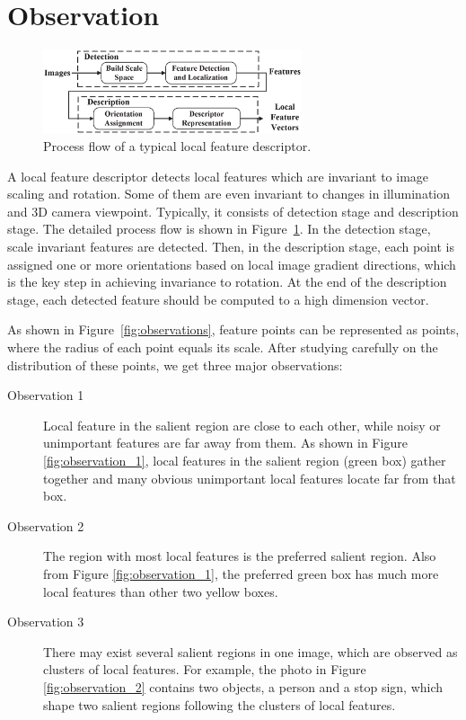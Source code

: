 \section{Observation}
\label{sec:observation}

\begin{figure}
	\centering
	\includegraphics[width=3.0in]{images/fig-workflow.eps}
	\caption{Process flow of a typical local feature descriptor.}
	\label{fig:workflow}
\end{figure}

A local feature descriptor detects local features which are invariant to image scaling and rotation. Some of them are even invariant to changes in illumination and 3D camera viewpoint. Typically, it consists of detection stage and description stage. The detailed process flow is shown in Figure~\ref{fig:workflow}. In the detection stage, scale invariant features are detected. Then, in the description stage, each point is assigned one or more orientations based on local image gradient directions, which is the key step in achieving invariance to rotation. At the end of the description stage, each detected feature should be computed to a high dimension vector. 

As shown in Figure~\ref{fig:observations}, feature points can be represented as points, where the radius of each point equals its scale. After studying carefully on the distribution of these points, we get three major observations:

\begin{description}
	
	\item[Observation 1]  Local feature in the salient region are close to each other, while noisy or unimportant features are far away from them. As shown in Figure \ref{fig:observation_1}, local features in the salient region (green box) gather together and many obvious unimportant local features locate far from that box.

	\item[Observation 2]  The region with most local features is the preferred salient region. Also from Figure \ref{fig:observation_1}, the preferred green box has much more local features than other two yellow boxes.

	\item[Observation 3]  There may exist several salient regions in one image, which are observed as clusters of local features. For example, the photo in Figure \ref{fig:observation_2} contains two objects, a person and a stop sign, which shape two salient regions following the clusters of local features.

\end{description}


